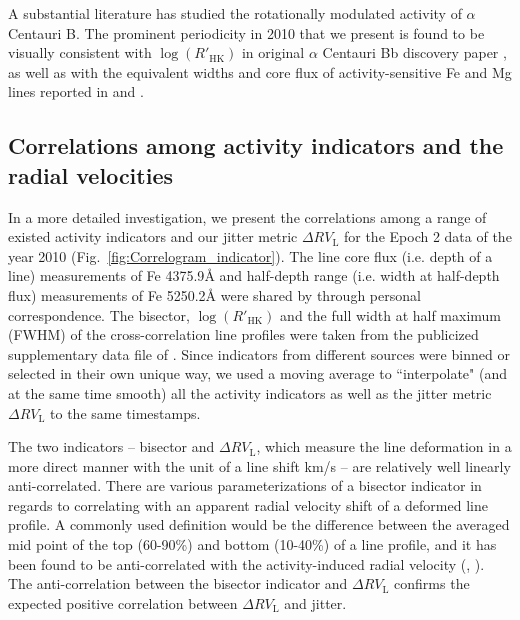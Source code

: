 A substantial literature has studied the rotationally modulated activity of $\alpha$ Centauri B. The prominent periodicity in 2010 that we present is found to be visually consistent with $\log (R'_\text{HK})$ in original $\alpha$ Centauri Bb discovery paper \cite{Dumusque_Centauri_B}, as well as with the equivalent widths and core flux of activity-sensitive Fe and Mg lines reported in \cite{Thompson2017MNRAS} and \cite{Wise2018}. 

\subsection{Correlations among activity indicators and the radial velocities}

In a more detailed investigation, we present the correlations among a range of existed activity indicators and our jitter metric $\Delta RV_\text{L}$ for the Epoch 2 data of the year 2010 (Fig.~\ref{fig:Correlogram_indicator}). The line core flux (i.e. depth of a line) measurements of Fe 4375.9{\AA} and half-depth range (i.e. width at half-depth flux) measurements of Fe 5250.2{\AA} were shared by \cite{Wise2018} through personal correspondence. The bisector, $\log (R'_\text{HK})$ and the full width at half maximum (FWHM) of the cross-correlation line profiles were taken from the publicized supplementary data file of \cite{Dumusque_Centauri_B}. Since indicators from different sources were binned or selected in their own unique way, we used a moving average to ``interpolate" (and at the same time smooth) all the activity indicators as well as the jitter metric $\Delta RV_\text{L}$ to the same timestamps. 


The two indicators -- bisector and $\Delta RV_\text{L}$, which measure the line deformation in a more direct manner with the unit of a line shift km/s -- are relatively well linearly anti-correlated. There are various parameterizations of a bisector indicator in regards to correlating with an apparent radial velocity shift of a deformed line profile. A commonly used definition would be the difference between the averaged mid point of the top (60-90\%) and bottom (10-40\%) of a line profile, and it has been found to be anti-correlated with the activity-induced radial velocity (\cite{Queloz2001Bis}, \cite{Figueira2013Bis}). The anti-correlation between the bisector indicator and $\Delta RV_\text{L}$ confirms the expected positive correlation between $\Delta RV_\text{L}$ and jitter. 

